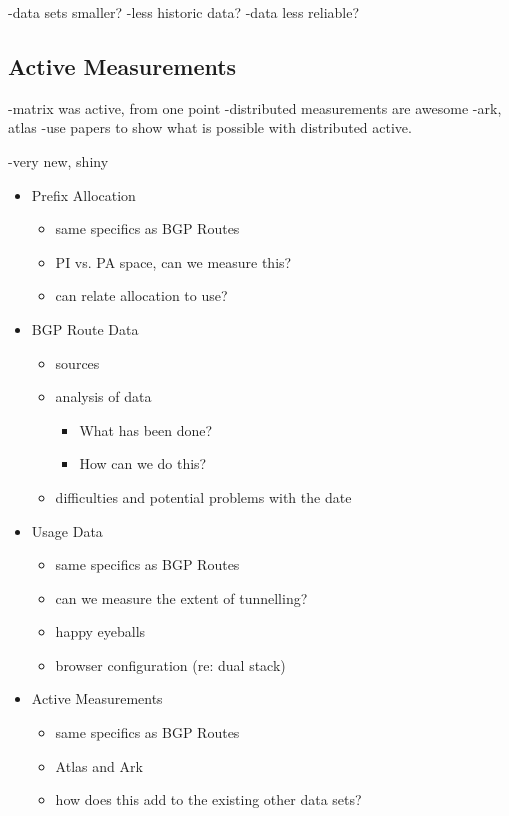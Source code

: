 -data sets smaller?
-less historic data?
-data less reliable?

\subsection{Active Measurements}

-matrix was active, from one point
-distributed measurements are awesome
-ark, atlas
-use papers to show what is possible with distributed active.

-very new, shiny

\begin{itemize}
    \item Prefix Allocation
    \begin{itemize}
        \item same specifics as BGP Routes
        \item PI vs. PA space, can we measure this?
        \item can relate allocation to use?
    \end{itemize}
    \item BGP Route Data
    \begin{itemize}
        \item sources
        \item analysis of data
        \begin{itemize}
            \item What has been done?
            \item How can we do this?
        \end{itemize}
        \item difficulties and potential problems with the date
    \end{itemize}
    \item Usage Data
    \begin{itemize}
        \item same specifics as BGP Routes
        \item can we measure the extent of tunnelling?
        \item happy eyeballs
        \item browser configuration (re: dual stack)
    \end{itemize}
    \item Active Measurements
    \begin{itemize}
        \item same specifics as BGP Routes
        \item Atlas and Ark
        \item how does this add to the existing other data sets?
    \end{itemize}
\end{itemize}
